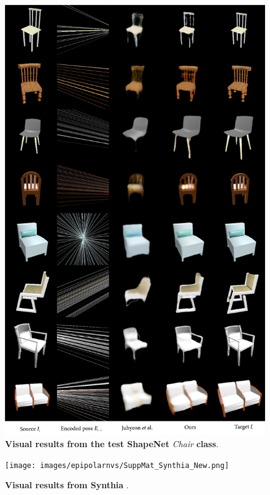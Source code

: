 \begin{figure}[htp!]
    \begin{center}
    \includegraphics[width=.95\textwidth]{images/epipolarnvs/SuppMat_Chair_New.png}
    \end{center}
     \caption{\textbf{Visual results from the test ShapeNet} \citep{xu2019disn} \textit{Chair} \textbf{class}.}
     \label{fig:add_visChair}
\end{figure}

\begin{figure}[htp!]
    \begin{center}
    \texttt{[image: images/epipolarnvs/SuppMat\_Synthia\_New.png]}
    \end{center}
     \caption{\textbf{Visual results from Synthia} \citep{ros2016synthia}.}
     \label{fig:add_visSynthia}
\end{figure}

